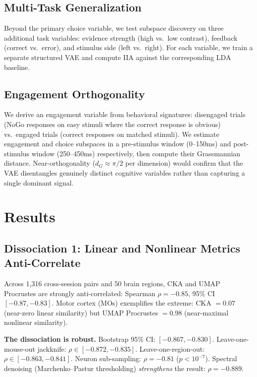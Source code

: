 \documentclass{article}
\begin{document}
\subsection{Multi-Task Generalization}

Beyond the primary choice variable, we test subspace discovery on three additional task variables: evidence strength (high vs.\ low contrast), feedback (correct vs.\ error), and stimulus side (left vs.\ right). For each variable, we train a separate structured VAE and compute IIA against the corresponding LDA baseline.

\subsection{Engagement Orthogonality}

We derive an engagement variable from behavioral signatures: disengaged trials (NoGo responses on easy stimuli where the correct response is obvious) vs.\ engaged trials (correct responses on matched stimuli). We estimate engagement and choice subspaces in a pre-stimulus window (0--150ms) and post-stimulus window (250--450ms) respectively, then compute their Grassmannian distance. Near-orthogonality ($d_G \approx \pi/2$ per dimension) would confirm that the VAE disentangles genuinely distinct cognitive variables rather than capturing a single dominant signal.

\section{Results}

\subsection{Dissociation 1: Linear and Nonlinear Metrics Anti-Correlate}

Across 1,316 cross-session pairs and 50 brain regions, CKA and UMAP Procrustes are strongly anti-correlated: Spearman $\rho = -0.85$, 95\% CI $[-0.87, -0.83]$. Motor cortex (MOs) exemplifies the extreme: CKA $= 0.07$ (near-zero linear similarity) but UMAP Procrustes $= 0.98$ (near-maximal nonlinear similarity).

\textbf{The dissociation is robust.} Bootstrap 95\% CI: $[-0.867, -0.830]$. Leave-one-mouse-out jackknife: $\rho \in [-0.872, -0.835]$. Leave-one-region-out: $\rho \in [-0.863, -0.841]$. Neuron sub-sampling: $\rho = -0.81$ ($p < 10^{-7}$). Spectral denoising (Marchenko--Pastur thresholding) \emph{strengthens} the result: $\rho = -0.889$.
\end{document}
